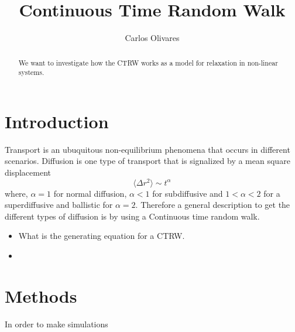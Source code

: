 \documentclass[a4paper,twocolumn,10pt]{article}
\title{Continuous Time Random Walk}
\author{Carlos Olivares}
\begin{document}
\maketitle

\begin{abstract}
We want to investigate how the CTRW works as a model for relaxation in non-linear systems.
\end{abstract}

\section{Introduction}
Transport is an ubuquitous non-equilibrium phenomena that occurs in different scenarios. Diffusion is one type of transport that is signalized by a mean square displacement
%
\begin{equation}
 \langle \Delta r^2 \rangle \sim t^{\alpha}
\end{equation}
%
where, $\alpha = 1$ for normal diffusion, $\alpha < 1$ for subdiffusive and $1 < \alpha <2 $ for a superdiffusive and ballistic for $\alpha = 2$.
%
Therefore a general description to get the different types of diffusion is by using a Continuous time random walk.


\begin{itemize}
 \item What is the generating equation for a CTRW.
 \item 
\end{itemize}


\section{Methods}
In order to make simulations
\end{document}

